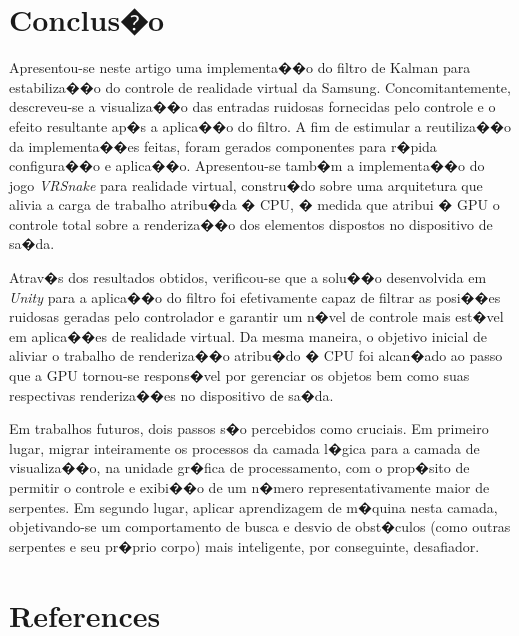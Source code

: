 \documentclass[12pt]{article}
\begin{document}
\section{Conclus�o}\label{sec:conclusion}

Apresentou-se neste artigo uma implementa��o do filtro de Kalman para estabiliza��o do controle de realidade virtual da Samsung. Concomitantemente, descreveu-se a visualiza��o das entradas ruidosas fornecidas pelo controle e o efeito resultante ap�s a aplica��o do filtro. A fim de estimular a reutiliza��o da implementa��es feitas, foram gerados componentes para r�pida configura��o e aplica��o. Apresentou-se tamb�m a implementa��o do jogo \textit{VRSnake} para realidade virtual, constru�do sobre uma arquitetura que alivia a carga de trabalho atribu�da � CPU, � medida que atribui � GPU o controle total sobre a renderiza��o dos elementos dispostos no dispositivo de sa�da.

Atrav�s dos resultados obtidos, verificou-se que a solu��o desenvolvida em \textit{Unity} para a aplica��o do filtro foi efetivamente capaz de filtrar as posi��es ruidosas geradas pelo controlador e garantir um n�vel de controle mais est�vel em aplica��es de realidade virtual. Da mesma maneira, o objetivo inicial de aliviar o trabalho de renderiza��o atribu�do � CPU foi alcan�ado ao passo que a GPU tornou-se respons�vel por gerenciar os objetos bem como suas respectivas renderiza��es no dispositivo de sa�da.

Em trabalhos futuros, dois passos s�o percebidos como cruciais. Em primeiro lugar, migrar inteiramente os processos da camada l�gica para a camada de visualiza��o, na unidade gr�fica de processamento, com o prop�sito de permitir o controle e exibi��o de um n�mero representativamente maior de serpentes. Em segundo lugar, aplicar aprendizagem de m�quina nesta camada, objetivando-se um comportamento de busca e desvio de obst�culos (como outras serpentes e seu pr�prio corpo) mais inteligente, por conseguinte, desafiador.

\section{References}



\end{document}
